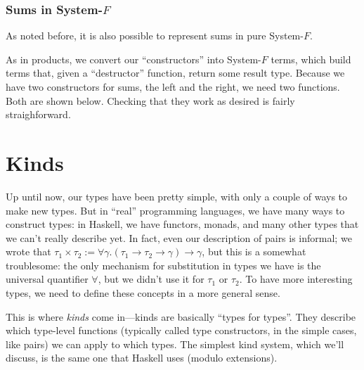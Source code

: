 \documentclass[10pt]{article}
\begin{document}
\subsubsection{Sums in System-$F$}

As noted before, it is also possible to represent sums in pure System-$F$.

As in products, we convert our ``constructors'' into System-$F$ terms, which build terms that, given a ``destructor'' function, return some result type.
Because we have two constructors for sums, the left and the right, we need two functions.
Both are shown below.
Checking that they work as desired is fairly straighforward.

\section{Kinds}

Up until now, our types have been pretty simple, with only a couple of ways to make new types.
But in ``real'' programming languages, we have many ways to construct types: in Haskell, we have functors, monads, and many other types that we can't really describe yet.
In fact, even our description of pairs is informal; we wrote that $\tau_1 \times \tau_2 := \forall \gamma . (\tau_1 \to \tau_2 \to \gamma) \to \gamma$, but this is a somewhat troublesome: the only mechanism for substitution in types we have is the universal quantifier $\forall$, but we didn't use it for $\tau_1$ or $\tau_2$.
To have more interesting types, we need to define these concepts in a more general sense.

This is where \emph{kinds} come in---kinds are basically ``types for types''.
They describe which type-level functions (typically called type constructors, in the simple cases, like pairs) we can apply to which types.
The simplest kind system, which we'll discuss, is the same one that Haskell uses (modulo extensions).
\end{document}
